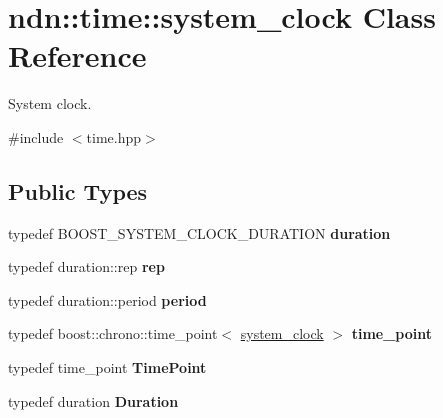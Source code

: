 \hypertarget{classndn_1_1time_1_1system__clock}{}\section{ndn\+:\+:time\+:\+:system\+\_\+clock Class Reference}
\label{classndn_1_1time_1_1system__clock}


System clock.  




{\ttfamily \#include $<$time.\+hpp$>$}

\subsection*{Public Types}
\begin{DoxyCompactItemize}
\item 
typedef B\+O\+O\+S\+T\+\_\+\+S\+Y\+S\+T\+E\+M\+\_\+\+C\+L\+O\+C\+K\+\_\+\+D\+U\+R\+A\+T\+I\+ON {\bfseries duration}\hypertarget{classndn_1_1time_1_1system__clock_afcfad822a88d02cd0f37f17875d3fcbd}{}\label{classndn_1_1time_1_1system__clock_afcfad822a88d02cd0f37f17875d3fcbd}

\item 
typedef duration\+::rep {\bfseries rep}\hypertarget{classndn_1_1time_1_1system__clock_a6ea654d1b067b4a432f52a183c726711}{}\label{classndn_1_1time_1_1system__clock_a6ea654d1b067b4a432f52a183c726711}

\item 
typedef duration\+::period {\bfseries period}\hypertarget{classndn_1_1time_1_1system__clock_a051c5e52ca8eedd096b06414453e3960}{}\label{classndn_1_1time_1_1system__clock_a051c5e52ca8eedd096b06414453e3960}

\item 
typedef boost\+::chrono\+::time\+\_\+point$<$ \hyperlink{classndn_1_1time_1_1system__clock}{system\+\_\+clock} $>$ {\bfseries time\+\_\+point}\hypertarget{classndn_1_1time_1_1system__clock_a1259c8af5df6f864be63b2674a47e44f}{}\label{classndn_1_1time_1_1system__clock_a1259c8af5df6f864be63b2674a47e44f}

\item 
typedef time\+\_\+point {\bfseries Time\+Point}\hypertarget{classndn_1_1time_1_1system__clock_a4912f5491929e693b0668148c284be79}{}\label{classndn_1_1time_1_1system__clock_a4912f5491929e693b0668148c284be79}

\item 
typedef duration {\bfseries Duration}\hypertarget{classndn_1_1time_1_1system__clock_ae246cdcbfb31b87c73cc5c4ef2fe1c56}{}\label{classndn_1_1time_1_1system__clock_ae246cdcbfb31b87c73cc5c4ef2fe1c56}

\end{DoxyCompactItemize}
